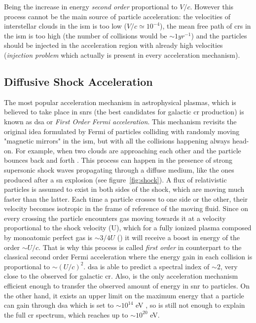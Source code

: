 \documentclass[main.tex]{subfiles}
\begin{document}
Being the increase in energy \textit{second order} proportional to $V/c$. However this process cannot be the main source of particle acceleration: the velocities of interstellar clouds in the \gls{ism} is too low ($V/c \simeq 10^{-4}$), the mean free path of \glspl{cr} in the \gls{ism} is too high (the number of collisions would be $\sim 1yr^{-1}$) and the particles should be injected in the acceleration region with already high velocities (\textit{injection problem} which actually is present in every acceleration mechanism).

\subsection{Diffusive Shock Acceleration}

The most popular acceleration mechanism in astrophysical plasmas, which is believed to take place in \glspl{snr} (the best candidates for galactic \gls{cr} production) is known as \gls{dsa} or \textit{First Order Fermi acceleration}. This mechanism revisits the original idea formulated by Fermi of particles colliding with randomly moving "magnetic mirrors" in the \gls{ism}, but  with all the collisions happening always head-on. For example, when two clouds are approaching each other and the particle bounces back and forth \cite{2009accelerationmech}. 
This process can happen in the presence of strong supersonic shock waves propagating through a diffuse medium, like the ones produced after a \gls{sn} explosion (see figure~\ref{fig:shock}). 
A flux of relativistic particles is assumed to exist in both sides of the shock, which are moving much faster than the latter. Each time a particle crosses to one side or the other, their velocity becomes isotropic in the frame of reference of the moving fluid. Since on every crossing the particle encounters gas moving towards it at a velocity proportional to the shock velocity (U), which for a fully ionized plasma composed by monoatomic perfect gas is $\sim 3/4 U$ (\cite{highenergyastrophy}) it will receive a boost in energy of the order $\sim U/c$. That is why this process is called \textit{first order} in counterpart to the classical second order Fermi acceleration where the energy gain in each collision is proportional to $\sim (U/c)^{2}$.  
\gls{dsa} is able to predict a spectral index of $\sim 2$, very close to the observed for galactic \gls{cr}. Also, is the only acceleration mechanism efficient enough to transfer the observed amount of energy in \gls{snr} to particles.
On the other hand, it exists an upper limit on the maximum energy that a particle can gain through \gls{dsa} which is set to $\sim 10^{14}$ eV \cite{1983maximumEinSNR}, so is still not enough to explain the full \gls{cr} spectrum, which reaches up to $\sim 10^{20}$ eV.
\end{document}
